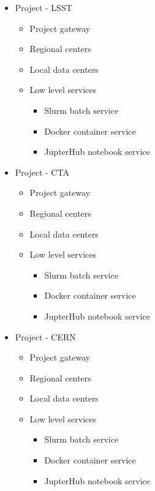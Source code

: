 \documentclass[11pt,a4paper]{ivoa}
\begin{document}
\begin{itemize}
    \item Project - LSST
    \begin{itemize}
        \item Project gateway
        \item Regional centers
        \item Local data centers
        \item Low level services
        \begin{itemize}
            \item Slurm batch service
            \item Docker container service
            \item JupterHub notebook service
        \end{itemize}
    \end{itemize}
\end{itemize}

\begin{itemize}
    \item Project - CTA
    \begin{itemize}
        \item Project gateway
        \item Regional centers
        \item Local data centers
        \item Low level services
        \begin{itemize}
            \item Slurm batch service
            \item Docker container service
            \item JupterHub notebook service
        \end{itemize}
    \end{itemize}
\end{itemize}

\begin{itemize}
    \item Project - CERN
    \begin{itemize}
        \item Project gateway
        \item Regional centers
        \item Local data centers
        \item Low level services
        \begin{itemize}
            \item Slurm batch service
            \item Docker container service
            \item JupterHub notebook service
        \end{itemize}
    \end{itemize}
\end{itemize}
\end{document}
